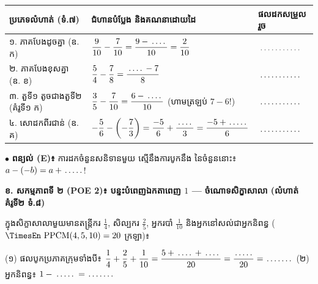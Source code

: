 \documentclass[a4paper,10pt]{article}
\newcommand{\en}[1]{{\TimesEn #1}}
\newcommand{\blank}[1][1.5cm]{\makebox[#1]{\dotfill}}
\begin{document}
{\renewcommand{\arraystretch}{1.64}
\begin{tabular}{|L{4.90cm}|L{8.70cm}|C{4.20cm}|}
  \hline
  \textbf{ប្រភេទលំហាត់ (ទំ.៧)} & \textbf{ជំហានបំប្លែង និងគណនាដោយដៃ} & \textbf{ផលដកសម្រួលរួច} \\
  \hline
  ១. ភាគបែងដូចគ្នា (ឧ. ក) & $\dfrac{9}{10} - \dfrac{7}{10} = \dfrac{9 - \blank[0.7cm]}{10} = \dfrac{2}{10}$ & $\blank[1.8cm]$ \\
  \hline
  ២. ភាគបែងខុសគ្នា (ឧ. ខ) & $\dfrac{5}{4} - \dfrac{7}{8} = \dfrac{\blank[0.7cm] - 7}{8}$ & $\blank[1.8cm]$ \\
  \hline
  ៣. តួទី១ តូចជាងតួទី២ (គំរូទី១ ក) & $\dfrac{3}{5} - \dfrac{7}{10} = \dfrac{6 - \blank[0.7cm]}{10}$ (ហាមត្រឡប់ $7-6$!) & $\blank[1.8cm]$ \\
  \hline
  ៤. សោដកពីរជាន់ (ឧ. គ) & $-\dfrac{5}{6} - \left(-\dfrac{7}{3}\right) = \dfrac{-5}{6} + \dfrac{\blank[0.7cm]}{3} = \dfrac{-5 + \blank[0.8cm]}{6}$ & $\blank[1.8cm]$ \\
  \hline
\end{tabular}}

\vspace{5pt}
$\bullet$ \textbf{ពន្យល់ (\en{E})៖} ការដកចំនួនសនិទានមួយ ស្មើនឹងការបូកនឹង \blank[2.8cm] នៃចំនួននោះ៖ $a - (-b) = a + \blank[0.8cm]$!

\vspace{6pt}
\textbf{ខ. សកម្មភាពទី ២ (\en{POE 2})៖ បន្ទះបំពេញឯកតាពេញ $1$ — ចំណោទសិក្ខាសាលា (លំហាត់គំរូទី២ ទំ.៨)}

\begin{tcolorbox}[enhanced, sharp corners, colback=white, colframe=black, boxrule=0.7pt, boxsep=2pt, top=3pt, bottom=3pt, left=5pt, right=5pt]
  ក្នុងសិក្ខាសាលាមួយមានតន្ត្រីករ $\frac{1}{4}$, សិល្បករ $\frac{2}{5}$, អ្នករបាំ $\frac{1}{10}$ និងអ្នកនៅសល់ជាអ្នកនិពន្ធ ($\text{\en{PPCM}}(4,5,10)=20$ ក្រឡា)៖\\[3pt]
  \begin{center}
  \end{center}
  \vspace{1pt}
  (១) ផលបូកប្រភាគក្រុមទាំងបី៖ $\dfrac{1}{4}+\dfrac{2}{5}+\dfrac{1}{10} = \dfrac{5 + \blank[0.7cm] + \blank[0.7cm]}{20} = \dfrac{\blank[0.8cm]}{20} = \blank[1.1cm]$ \;\en{|}\;
  (២) អ្នកនិពន្ធ៖ $1 - \blank[0.9cm] = \blank[1.1cm]$
\end{tcolorbox}
\end{document}
